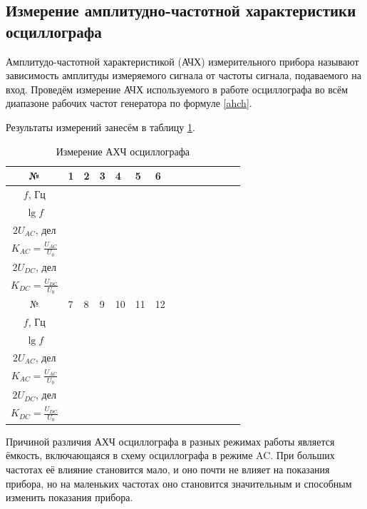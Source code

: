\documentclass[a4paper,12pt]{article} %
\begin{document}
	
	\subsection{Измерение амплитудно-частотной характеристики осциллографа}
	
	Амплитудо-частотной характеристикой (АЧХ) измерительного прибора называют зависимость амплитуды измеряемого
	сигнала от частоты сигнала, подаваемого на вход. Проведём измерение АЧХ используемого в работе осциллографа во всём диапазоне
	рабочих частот генератора по формуле \eqref{ahch}.
	
	Результаты измерений занесём в таблицу \ref{tab:ahch}.
	
	\begin{table}[H]
		\centering
		\begin{tabular}{|c|p{1.2cm}|p{1.2cm}|p{1.2cm}|p{1.2cm}|p{1.2cm}|p{1.2cm}| c|c|c|c|c|c|c|} 
			\hline
			№ &  1  & 2  &  3  &  4  & 5 & 6 \\ \hline
			$ f $, Гц &   &  &  &  & &  \\ \hline
			$ \lg f $ &  &  &  &  & &  \\ \hline
			$ 2U_{AC} $, дел & &  &  &  & &  \\ \hline
			$ K_{AC} = \frac{U_{AC}}{U_0} $& &  &  &  & &  \\ \hline
			$ 2U_{DC} $, дел & &  &  &  & &  \\ \hline
			$ K_{DC} = \frac{U_{DC}}{U_0} $ & &  &  &  & &  \\ \hline \hline
			№ & 7 & 8 & 9 & 10 & 11 & 12 \\ \hline
			$ f $, Гц & &  &  &  & &  \\ \hline
			$ \lg f $ & &  &  &  & &  \\ \hline
			$ 2U_{AC} $, дел & &  &  &  & &  \\ \hline
			$ K_{AC} = \frac{U_{AC}}{U_0} $ & &  &  &  & &  \\ \hline
			$ 2U_{DC} $, дел & &  &  &  & &  \\ \hline
			$ K_{DC} = \frac{U_{DC}}{U_0} $ & &  &  &  & &  \\ \hline
		\end{tabular}
		\caption{Измерение АХЧ осциллографа}
		\label{tab:ahch}
	\end{table}
	
	Причиной различия АХЧ осциллографа в разных режимах работы является ёмкость, включающаяся в схему осциллографа в режиме AC. При больших частотах её влияние становится мало, и оно почти не влияет на показания прибора, но на маленьких частотах оно становится значительным и способным изменить показания прибора.
	
\end{document}
